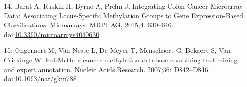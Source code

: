 \documentclass[10pt,letterpaper]{article}
\begin{document}
\leavevmode\hypertarget{ref-Barat2015}{}%
14. Barat A, Ruskin H, Byrne A, Prehn J. Integrating Colon Cancer
Microarray Data: Associating Locus-Specific Methylation Groups to Gene
Expression-Based Classifications. Microarrays. MDPI AG; 2015;4:
630--646.
doi:\href{https://doi.org/10.3390/microarrays4040630}{10.3390/microarrays4040630}

\leavevmode\hypertarget{ref-Ongenaert2007}{}%
15. Ongenaert M, Van Neste L, De Meyer T, Menschaert G, Bekaert S, Van
Criekinge W. PubMeth: a cancer methylation database combining
text-mining and expert annotation. Nucleic Acids Research. 2007;36:
D842--D846.
doi:\href{https://doi.org/10.1093/nar/gkm788}{10.1093/nar/gkm788}

\nolinenumbers
\end{document}
